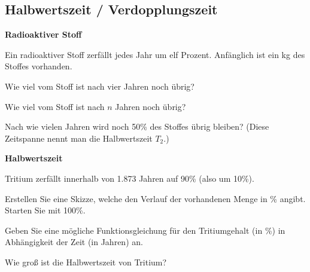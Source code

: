 
\subsection{Halbwertszeit / Verdopplungszeit}


\bbwActAufgabenNr{} \textbf{Radioaktiver Stoff}

Ein radioaktiver Stoff zerfällt jedes Jahr um elf Prozent. Anfänglich ist ein kg des Stoffes vorhanden.

\begin{bbwAufgabenBlock}
\item Wie viel vom Stoff ist nach vier Jahren noch übrig?
\item Wie viel vom Stoff ist nach $n$ Jahren noch übrig?
\item Nach wie vielen Jahren wird noch 50\% des Stoffes übrig bleiben? (Diese Zeitspanne nennt man die Halbwertszeit $T_2$.)
\end{bbwAufgabenBlock}
\platzFuerBerechnungenBisEndeSeite{}




\bbwActAufgabenNr{} \textbf{Halbwertszeit}

Tritium zerfällt innerhalb von 1.873 Jahren auf 90\%  (also um 10\%).


\begin{bbwAufgabenBlock}
\item Erstellen Sie eine Skizze, welche den Verlauf der vorhandenen
  Menge in \% angibt. Starten Sie mit 100\%.


\item Geben Sie eine mögliche Funktionsgleichung für den Tritiumgehalt
  (in \%)
  in Abhängigkeit der Zeit (in Jahren) an.

  
\item  
  Wie groß ist die Halbwertszeit von Tritium?

\end{bbwAufgabenBlock}
\platzFuerBerechnungenBisEndeSeite{}


